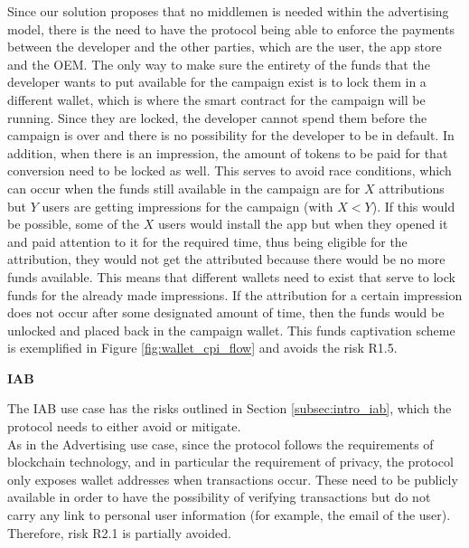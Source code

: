 Since our solution proposes that no middlemen is needed within the advertising model, there is the need to have the protocol being able to enforce the payments between the developer and the other parties, which are the user, the app store and the OEM. The only way to make sure the entirety of the funds that the developer wants to put available for the campaign exist is to lock them in a different wallet, which is where the smart contract for the campaign will be running. Since they are locked, the developer cannot spend them before the campaign is over and there is no possibility for the developer to be in default. In addition, when there is an impression, the amount of tokens to be paid for that conversion need to be locked as well. This serves to avoid race conditions, which can occur when the funds still available in the campaign are for $X$ attributions but $Y$ users are getting impressions for the campaign (with $X < Y$). If this would be possible, some of the $X$ users would install the app but when they opened it and paid attention to it for the required time, thus being eligible for the attribution, they would not get the attributed because there would be no more funds available. This means that different wallets need to exist that serve to lock funds for the already made impressions. If the attribution for a certain impression does not occur after some designated amount of time, then the funds would be unlocked and placed back in the campaign wallet. This funds captivation scheme is exemplified in Figure \ref{fig:wallet_cpi_flow} and avoids the risk \textsf{R1.5}. \\

\medskip

{\bf IAB}

The IAB use case has the risks outlined in Section \ref{subsec:intro_iab}, which the protocol needs to either avoid or mitigate. \\

As in the Advertising use case, since the protocol follows the requirements of blockchain technology, and in particular the requirement of privacy, the protocol only exposes wallet addresses when transactions occur. These need to be publicly available in order to have the possibility of verifying transactions but do not carry any link to personal user information (for example, the email of the user). Therefore, risk \textsf{R2.1} is partially avoided. \\

